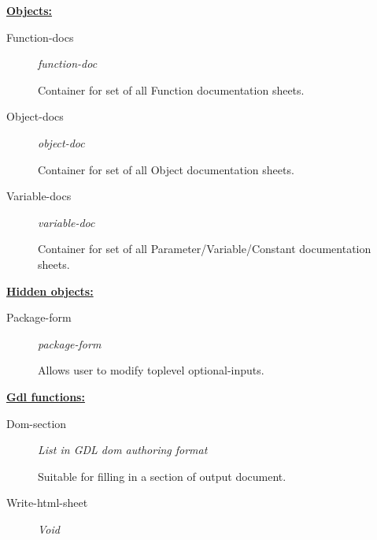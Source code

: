 \documentclass [11pt]{book}
\begin{document}
\begin{itemize}
\textbf{
\underline{Objects:}}

\begin{description}

\item [Function-docs]
\emph{function-doc}

 Container for set of all Function documentation sheets.




\item [Object-docs]
\emph{object-doc}

 Container for set of all Object documentation sheets.




\item [Variable-docs]
\emph{variable-doc}

 Container for set of all Parameter/Variable/Constant documentation sheets.




\end{description}






\textbf{
\underline{Hidden objects:}}

\begin{description}

\item [Package-form]
\emph{package-form}

 Allows user to modify toplevel optional-inputs.




\end{description}






\textbf{
\underline{Gdl functions:}}

\begin{description}

\item [Dom-section]
\emph{List in GDL dom authoring format}

 Suitable for filling in a section of output document.




\item [Write-html-sheet]
\emph{Void}


\end{description}
\end{itemize}
\end{document}
